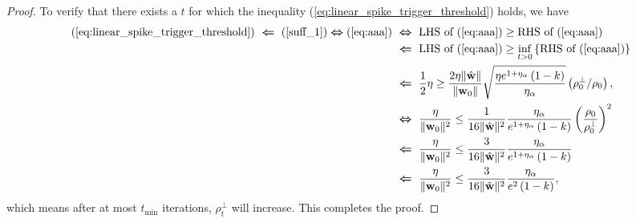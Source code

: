 \documentclass[pdflatex,sn-basic]{sn-jnl}%
\theoremstyle{thmstyleone}%
\begin{document}
\begin{appendices}
\begin{proof}
  To verify that there exists a $t$ for which the inequality (\ref{eq:linear_spike_trigger_threshold}) holds, we have 
  \begin{equation*}
  \begin{aligned}
    (\ref{eq:linear_spike_trigger_threshold})
    \ \boldsymbol{\Leftarrow} \ 
    (\ref{suff_1})
    \boldsymbol{\Leftrightarrow}
    (\ref{eq:aaa})
    & \ \boldsymbol{\Leftrightarrow} \ 
    \text{LHS of }(\ref{eq:aaa}) \ge 
    \text{RHS of }(\ref{eq:aaa})
    \\ & \ \boldsymbol{\Leftarrow} \ 
    \text{LHS of }(\ref{eq:aaa}) \ge 
    \inf_{t > 0} \left\{
      \text{RHS of }(\ref{eq:aaa})
    \right\}
    \\ & \ \boldsymbol{\Leftarrow} \ 
    \frac{1}{2} \eta \ge 
    \frac{2\eta \Vert \hat{\mathbf{w}} \Vert }{\Vert \mathbf{w}_0 \Vert} 
    \sqrt{
      \frac{\eta e^{1+\eta_{\alpha}} \left( 1 - k \right)}{\eta_\alpha}
    }
    \left(\rho_{0}^{\perp} / \rho_0\right),
    \\ & \ \boldsymbol{\Leftrightarrow} \ 
    \frac{\eta}{\Vert {\mathbf{w}}_0 \Vert^2}
    \le 
    \frac{1}{16\Vert \hat{\mathbf{w}} \Vert^2}
    \frac{\eta_\alpha}{e^{1+\eta_{\alpha}} \left( 1 - k \right)}
    \left(
      \frac{\rho_0}{\rho_{0}^{\perp}}
    \right)^2
    \\ & \ \boldsymbol{\Leftarrow} \ 
    \frac{\eta}{\Vert {\mathbf{w}}_0 \Vert^2}
    \le 
    \frac{3}{16\Vert \hat{\mathbf{w}} \Vert^2}
    \frac{\eta_\alpha}{e^{1+\eta_{\alpha}} \left( 1 - k \right)}
    \\ & \ \boldsymbol{\Leftarrow} \ 
    \frac{\eta}{\Vert {\mathbf{w}}_0 \Vert^2}
    \le 
    \frac{3}{16\Vert \hat{\mathbf{w}} \Vert^2}
    \frac{\eta_\alpha}{e^{2} \left( 1 - k \right)},
  \end{aligned}
  \end{equation*}
  which means after at most $t_{\min}$ iterations, $\rho_t^{\perp}$ will increase. This completes the proof. 
\end{proof}


\end{appendices}
\end{document}
